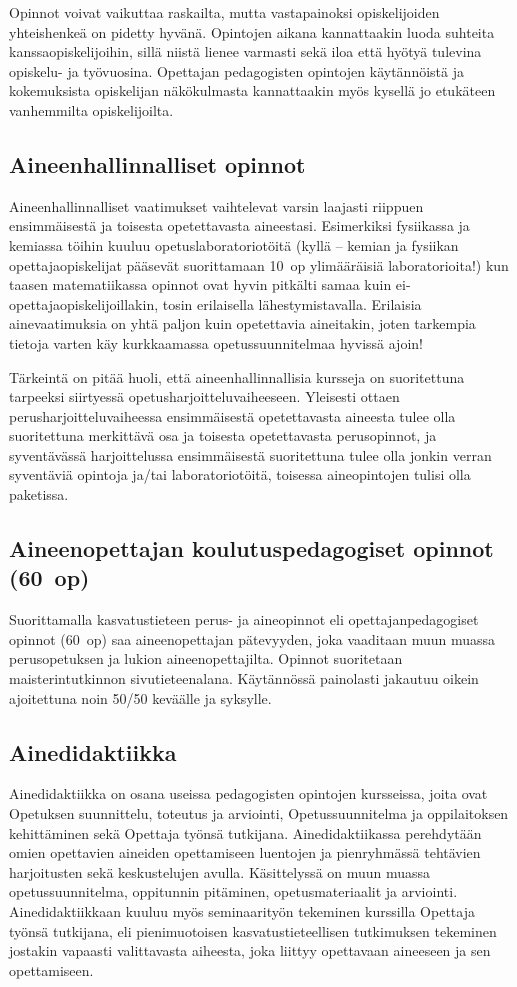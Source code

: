 \documentclass[../ala_hataile.tex]{subfiles}
\begin{document}
Opinnot voivat vaikuttaa raskailta,
mutta vastapainoksi opiskelijoiden yhteis\-henkeä
on pidetty hyvänä. Opintojen aikana
kannattaakin luoda suhteita kanssa\-opiskelijoihin,
sillä niistä lienee varmasti sekä
iloa että hyötyä tulevina opiskelu- ja työ\-vuosina.
Opettajan pedagogisten opintojen
käytännöistä ja kokemuksista opiskelijan
näkökulmasta kannattaakin myös kysellä
jo etukäteen vanhemmilta opiskelijoilta.
\subsection*{Aineenhallinnalliset opinnot}
Aineen\-hallinnalliset vaatimukset vaihtelevat
varsin laajasti riippuen ensimmäisestä
ja toisesta opetettavasta aineestasi. Esimerkiksi
fysiikassa ja kemiassa töihin kuuluu
opetus\-laboratorio\-töitä (kyllä -- kemian ja
fysiikan opettaja\-opiskelijat pääsevät suorittamaan
10~op ylimääräisiä laboratorioita!)
kun taasen matematiikassa opinnot ovat
hyvin pitkälti samaa kuin ei-opettaja\-opiskelijoillakin,
tosin erilaisella lähestymis\-tavalla.
Erilaisia aine\-vaatimuksia on yhtä
paljon kuin opetettavia aineitakin, joten
tarkempia tietoja varten käy kurkkaamassa
opetussuunnitelmaa hyvissä ajoin!

Tärkeintä on pitää huoli, että aineen\-hallinnallisia
kursseja on suoritettuna tarpeeksi
siirtyessä opetus\-harjoittelu\-vaiheeseen.
Yleisesti ottaen perus\-harjoittelu\-vaiheessa
ensimmäisestä opetettavasta aineesta tulee olla suoritettuna merkittävä
osa ja toisesta opetettavasta perusopinnot, ja syventävässä harjoittelussa
ensimmäisestä suoritettuna tulee olla jonkin
verran syventäviä opintoja ja/tai laboratoriotöitä, toisessa aineopintojen tulisi olla
paketissa.

\subsection*{Aineenopettajan koulutuspedagogiset opinnot (60~op)}
Suorittamalla kasvatustieteen perus- ja
aineopinnot eli opettajanpedagogiset
opinnot (60~op) saa aineenopettajan pätevyyden,
joka vaaditaan muun muassa perus\-opetuksen
ja lukion aineen\-opettajilta.
Opinnot suoritetaan maisterintutkinnon sivu\-tieteen\-alana. Käytännössä paino\-lasti jakautuu oikein ajoitettuna noin 50/50
keväälle ja syksylle.
\subsection*{Ainedidaktiikka}
Ainedidaktiikka on osana useissa pedagogisten opintojen kursseissa, joita ovat Opetuksen suunnittelu, toteutus ja arviointi, Opetus\-suunnitelma ja oppilaitoksen kehittäminen sekä Opettaja työnsä tutkijana. Aine\-didaktiikassa perehdytään omien
opettavien aineiden
opettamiseen luentojen ja pienryhmässä
tehtävien harjoitusten sekä keskustelujen
avulla. Käsittelyssä on muun muassa
opetus\-suunnitelma, oppitunnin pitäminen,
opetus\-materiaalit ja arviointi. Aine\-didaktiikkaan
kuuluu myös seminaarityön tekeminen kurssilla Opettaja työnsä tutkijana, eli
pienimuotoisen kasvatus\-tieteellisen tutkimuksen
tekeminen jostakin vapaasti valittavasta
aiheesta, joka liittyy opettavaan
aineeseen ja sen opettamiseen.
\end{document}

